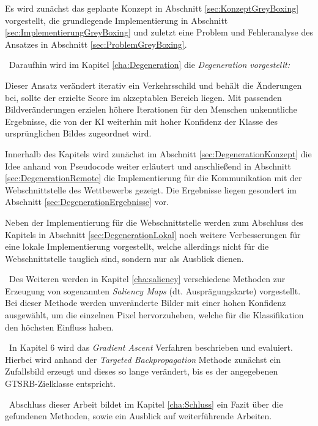 Es wird zunächst das geplante Konzept in Abschnitt \ref{sec:KonzeptGreyBoxing} vorgestellt, die grundlegende Implementierung in Abschnitt \ref{sec:ImplementierungGreyBoxing} und zuletzt eine Problem und Fehleranalyse des Ansatzes in Abschnitt \ref{sec:ProblemGreyBoxing}.


~\newline Daraufhin wird im Kapitel \ref{cha:Degeneration} die \textit{Degeneration vorgestellt:}

Dieser Ansatz verändert iterativ ein Verkehrsschild und behält die Änderungen bei, sollte der erzielte Score im akzeptablen Bereich liegen. 
Mit passenden Bildveränderungen erzielen höhere Iterationen für den Menschen unkenntliche Ergebnisse, die von der \ac{KI} weiterhin mit hoher Konfidenz der Klasse des ursprünglichen Bildes zugeordnet wird. 

Innerhalb des Kapitels wird zunächst im Abschnitt \ref{sec:DegenerationKonzept} die Idee anhand von Pseudocode weiter erläutert und anschließend in Abschnitt \ref{sec:DegenerationRemote} die Implementierung für die Kommunikation mit der Webschnittstelle des Wettbewerbs gezeigt. 
Die Ergebnisse liegen gesondert im Abschnitt \ref{sec:DegenerationErgebnisse} vor. 

Neben der Implementierung für die Webschnittstelle werden zum Abschluss des Kapitels in Abschnitt \ref{sec:DegenerationLokal} noch weitere Verbesserungen für eine lokale Implementierung vorgestellt, welche allerdings nicht für die Webschnittstelle tauglich sind, sondern nur als Ausblick dienen.


~\newline Des Weiteren werden in Kapitel \ref{cha:saliency} verschiedene Methoden zur Erzeugung von sogenannten \textit{Saliency Maps} (dt. Ausprägungskarte) vorgestellt. 
Bei dieser Methode werden unveränderte Bilder mit einer hohen Konfidenz ausgewählt, um die einzelnen Pixel hervorzuheben, welche für die Klassifikation den höchsten Einfluss haben.

~\newline In Kapitel 6 wird das \textit{Gradient Ascent} Verfahren beschrieben und evaluiert. 
Hierbei wird anhand der \textit{Targeted Backpropagation} Methode zunächst ein Zufallsbild erzeugt und dieses so lange verändert, bis es der angegebenen \ac{GTSRB}-Zielklasse entspricht.

~\newline Abschluss dieser Arbeit bildet im Kapitel \ref{cha:Schluss} ein Fazit über die gefundenen Methoden, sowie ein Ausblick auf weiterführende Arbeiten. 
